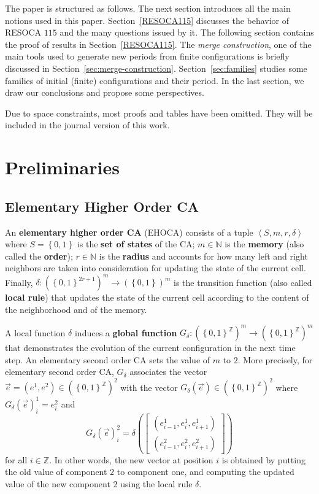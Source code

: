 \documentclass[submission,copyright,creativecommons]{eptcs}
\newcommand{\zo}{\set{0,1}}
\newcommand{\structure}[1]{\ensuremath{\left\langle#1\right\rangle}\xspace}
\newcommand{\set}[1]{\ensuremath{\left\{#1\right\}}\xspace}
\newcommand{\N}{\ensuremath{\mathbb{N}}\xspace}
\newcommand{\Z}{\ensuremath{\mathbb{Z}}\xspace}
\newcommand{\LF}{\ensuremath{\delta}\xspace}
\newcommand{\GF}[1]{\ensuremath{G_{#1}}\xspace}
\begin{document}
The paper is structured as follows. The next section introduces all the main notions
used in this paper. Section~\ref{RESOCA115}
discusses the behavior of RESOCA $115$
and the many questions issued by it.
The following section contains the proof of results in Section~\ref{RESOCA115}.
The \emph{merge construction}, one of the main
tools used to generate new periods from
finite configurations is briefly discussed
in Section~\ref{sec:merge-construction}.
Section~\ref{sec:families} studies some families of initial (finite) configurations and their period. In the last section, we draw our conclusions and propose some perspectives.
\medskip

Due to space constraints, most proofs and tables have been omitted. They will be included in the journal version of this work.


\section{Preliminaries}
\subsection{Elementary Higher Order CA}
An \textbf{elementary higher order CA} (EHOCA) consists of a tuple \structure{S,m,r,\delta} where $S=\zo$ is the
\textbf{set of states} of the CA; $m\in\N$ is the \textbf{memory} (also called the \textbf{order}); $r\in\N$ is
the
\textbf{radius} and accounts for how many left and right neighbors are taken into consideration for updating the state of the current cell. Finally, $\delta\colon\left(\zo^{2r+1}\right)^m\to\left(\zo\right)^m$ is the transition function (also called \textbf{local rule}) that updates the state of the current cell according to
the content of the neighborhood and of the memory. 

A local function \LF induces a \textbf{global function}
$\GF{\delta}\colon\left(\zo^\Z\right)^m\to\left(\zo^\Z\right)^m$
that demonstrates the evolution of the current configuration in the next time step. An elementary second order CA sets the value of $m$ to $2$. More precisely, for elementary second order CA, $\GF{\delta}$ associates
the vector $\Vec{e}=(e^1,e^2)\in\left(\zo^\Z\right)^2$ with the vector $\GF{\delta}\left(\Vec{e}\right)\in\left(\zo^\Z\right)^2$ 
where $\GF{\delta}\left(\Vec{e}\right)^1_i=e^2_i$ and
\[
\GF{\delta}\left(
\Vec{e}
\right)^2_i
=
\delta\left(
\begin{bmatrix}
(e^1_{i-1},e^1_i,e^1_{i+1})\\
(e^2_{i-1},e^2_i,e^2_{i+1})
\end{bmatrix}
\right)
\]
for all $i\in\Z$. In other words, the new vector at position $i$ is obtained by
putting the old value of component $2$ to component one, and
computing the updated value of the new component $2$ using the local rule 
$\delta$.
\end{document}
